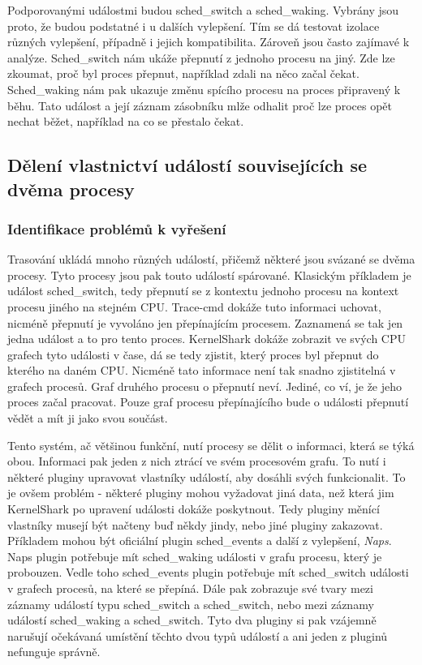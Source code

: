 Podporovanými událostmi budou sched\_switch a sched\_waking. Vybrány jsou proto, že budou podstatné i u dalších vylepšení. Tím se dá testovat izolace různých vylepšení, případně i jejich kompatibilita. Zároveň jsou často zajímavé k analýze. Sched\_switch nám ukáže přepnutí z jednoho procesu na jiný. Zde lze zkoumat, proč byl proces přepnut, například zdali na něco začal čekat. Sched\_waking nám pak ukazuje změnu spícího procesu na proces připravený k běhu. Tato událost a její záznam zásobníku mlže odhalit proč lze proces opět nechat běžet, například na co se přestalo čekat.

\subsection{Dělení vlastnictví událostí souvisejících se dvěma procesy}

\subsubsection*{Identifikace problémů k vyřešení}
Trasování ukládá mnoho různých událostí, přičemž některé jsou svázané se dvěma procesy. Tyto procesy jsou pak touto událostí spárované. Klasickým příkladem je událost sched\_switch, tedy přepnutí se z kontextu jednoho procesu na kontext procesu jiného na stejném CPU. Trace-cmd dokáže tuto informaci uchovat, nicméně přepnutí je vyvoláno jen přepínajícím procesem. Zaznamená se tak jen jedna událost a to pro tento proces. KernelShark dokáže zobrazit ve svých CPU grafech tyto události v čase, dá se tedy zjistit, který proces byl přepnut do kterého na daném CPU. Nicméně tato informace není tak snadno zjistitelná v grafech procesů. Graf druhého procesu o přepnutí neví. Jediné, co ví, je že jeho proces začal pracovat. Pouze graf procesu přepínajícího bude o události přepnutí vědět a mít ji jako svou součást.

Tento systém, ač většinou funkční, nutí procesy se dělit o informaci, která se týká obou. Informaci pak jeden z nich ztrácí ve svém procesovém grafu. To nutí i některé pluginy upravovat vlastníky událostí, aby dosáhli svých funkcionalit. To je ovšem problém - některé pluginy mohou vyžadovat jiná data, než která jim KernelShark po upravení události dokáže poskytnout. Tedy pluginy měnící vlastníky musejí být načteny buď někdy jindy, nebo jiné pluginy zakazovat. Příkladem mohou být oficiální plugin sched\_events a další z vylepšení, \emph{Naps}. Naps plugin potřebuje mít sched\_waking události v grafu procesu, který je probouzen. Vedle toho sched\_events plugin potřebuje mít sched\_switch události v grafech procesů, na které se přepíná. Dále pak zobrazuje své tvary mezi záznamy událostí typu sched\_switch a sched\_switch, nebo mezi záznamy událostí sched\_waking a sched\_switch. Tyto dva pluginy si pak vzájemně narušují očekávaná umístění těchto dvou typů událostí a ani jeden z pluginů nefunguje správně.

